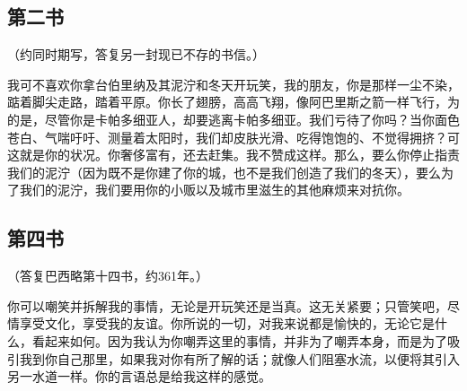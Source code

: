 
\subsection{第二书}

（约同时期写，答复另一封现已不存的书信。）\par

我可不喜欢你拿台伯里纳及其泥泞和冬天开玩笑，我的朋友，你是那样一尘不染，踮着脚尖走路，踏着平原。你长了翅膀，高高飞翔，像阿巴里斯之箭一样飞行，为的是，尽管你是卡帕多细亚人，却要逃离卡帕多细亚。我们亏待了你吗？当你面色苍白、气喘吁吁、测量着太阳时，我们却皮肤光滑、吃得饱饱的、不觉得拥挤？可这就是你的状况。你奢侈富有，还去赶集。我不赞成这样。那么，要么你停止指责我们的泥泞（因为既不是你建了你的城，也不是我们创造了我们的冬天），要么为了我们的泥泞，我们要用你的小贩以及城市里滋生的其他麻烦来对抗你。\par


\subsection{第四书}

（答复巴西略第十四书，约361年。）\par

你可以嘲笑并拆解我的事情，无论是开玩笑还是当真。这无关紧要；只管笑吧，尽情享受文化，享受我的友谊。你所说的一切，对我来说都是愉快的，无论它是什么，看起来如何。因为我认为你嘲弄这里的事情，并非为了嘲弄本身，而是为了吸引我到你自己那里，如果我对你有所了解的话；就像人们阻塞水流，以便将其引入另一水道一样。你的言语总是给我这样的感觉。\par

